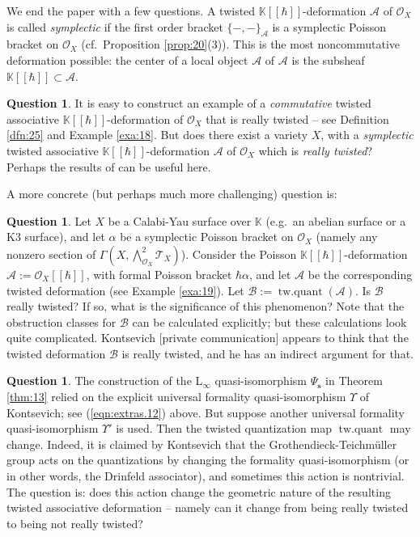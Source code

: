 \documentclass[a4paper, 10pt]{amsart}
\theoremstyle{definition}
\newtheorem{que}[equation]{Question}
\numberwithin{equation}{section}
\newcommand{\opn}{\operatorname}
\newcommand{\mcal}[1]{\mathcal{#1}}
\newcommand{\mrm}[1]{\mathrm{#1}}
\newcommand{\mbb}[1]{\mathbb{#1}}
\newcommand{\bsym}[1]{\boldsymbol{#1}}
\newcommand{\K}{\mbb{K}}
\newcommand{\bwedge}{{\textstyle \bigwedge}}
\newcommand{\gerbe}[1]{\bsym{\mcal{#1}}}
\begin{document}
We end the paper with a few questions. 
A twisted $\K[[\hbar]]$-deformation $\gerbe{A}$ of $\mcal{O}_X$
is called {\em symplectic} if the first order bracket
$\{ -,- \}_{\gerbe{A}}$ is a symplectic Poisson bracket on
$\mcal{O}_X$ (cf.\ Proposition \ref{prop:20}(3)). 
This is the most noncommutative deformation possible: the center of a local
object $\mcal{A}$ of $\gerbe{A}$ is the subsheaf 
$\K[[\hbar]] \subset \mcal{A}$. 

\begin{que}
It is easy to construct an example of a {\em commutative} twisted
associative $\K[[\hbar]]$-deformation of $\mcal{O}_X$ that is
really twisted -- see Definition \ref{dfn:25} and Example \ref{exa:18}. But
does there exist a variety $X$, with  a  {\em symplectic} twisted associative
$\K[[\hbar]]$-deformation $\gerbe{A}$ of $\mcal{O}_X$ which is {\em really
twisted}? Perhaps the results of \cite{BK} can be useful here.
\end{que}

A more concrete (but perhaps much more challenging) question is:

\begin{que} \label{que:1}
Let $X$ be a Calabi-Yau surface over $\K$ (e.g.\ an abelian surface or
a K3 surface), and let
$\alpha$ be a symplectic Poisson bracket on $\mcal{O}_X$ (namely any
nonzero section of $\Gamma(X, \bwedge^{2}_{\mcal{O}_X} \mcal{T}_X)$).
Consider the Poisson $\K[[\hbar]]$-deformation 
$\mcal{A} := \mcal{O}_X[[\hbar]]$, with formal Poisson bracket
$\hbar \alpha$, and let $\gerbe{A}$ be the corresponding twisted
deformation (see Example \ref{exa:19}). 
Let $\gerbe{B} := \opn{tw{.}quant}(\gerbe{A})$. Is $\gerbe{B}$ really
twisted? 
If so, what is the significance of this phenomenon?
Note that the obstruction classes for $\gerbe{B}$
can be calculated explicitly; but these calculations look quite
complicated. 
Kontsevich [private communication] appears to think that the twisted
deformation $\gerbe{B}$ is really twisted, and he has an indirect
argument for that.
\end{que}

\begin{que}
The construction of the $\mrm{L}_{\infty}$ quasi-isomorphism 
$\Psi_{\bsym{s}}$ in Theorem \ref{thm:13} relied on the explicit universal
formality quasi-isomorphism $\Upsilon$ of Kontsevich; see (\ref{eqn:extras.12})
above. But suppose another universal formality quasi-isomorphism $\Upsilon'$
is used. Then the twisted quantization map 
$\opn{tw{.}quant}$ may change. Indeed, it is claimed by Kontsevich
\cite{Ko3} that the Grothendieck-Teichm\"uller group acts on the
quantizations by changing the formality quasi-iso\-morphism (or in
other words, the Drinfeld associator), and sometimes this action is
nontrivial. The question is: does this action change the geometric
nature of the resulting twisted associative deformation -- namely can
it change from being really twisted to being not really twisted?
\end{que}
\end{document}
